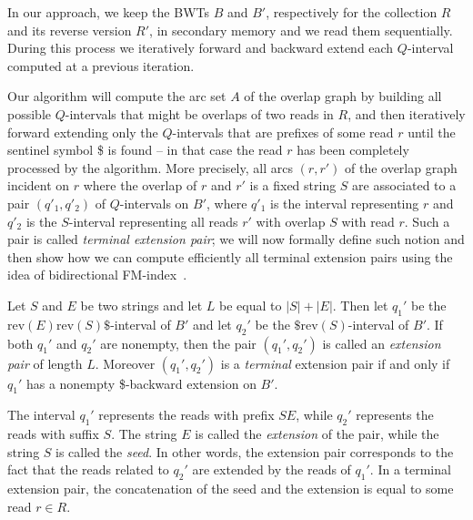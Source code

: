 \documentclass[runningheads,envcountsame,a4paper]{llncs}
\newcommand{\rev}{\ensuremath{\mathrm{rev}}}
\begin{document}
In our approach, we keep the BWTs $B$  and  $B'$, respectively  for the collection $R$ and its
reverse version $R'$,  in secondary memory and we read them sequentially.
During this process we iteratively forward and backward extend each
$Q$-interval computed at a previous iteration.

Our algorithm  will compute the arc set $A$  of the overlap graph
by building all possible $Q$-intervals that might be overlaps of two
reads in $R$, and then iteratively forward extending only the $Q$-intervals that
are prefixes of some read $r$ until the sentinel symbol \$ is
found -- in that case the read $r$ has been completely processed by the algorithm.
More precisely,    all arcs    $(r,r')$ of the overlap graph incident on $r$ where the overlap of $r$ and $r'$ is a fixed string $S$ are  associated to a pair  $(q'_1, q'_2)$ of $Q$-intervals on $B'$,
where $q'_1$ is the interval  representing   $r$ and $q'_2$ is the  $S$-interval representing all reads
 $r'$ with overlap $S$ with read $r$. Such a pair is called {\em terminal
extension pair}; we will now  formally define such notion and then show how we
can compute efficiently all terminal extension pairs
using the idea of bidirectional FM-index~\cite{Lam2009}.

\begin{definition}\label{def:extension-pair}
Let $S$ and $E$ be two strings and let $L$ be equal to $|S|+|E|$.
Then let $q_{1}'$ be the $\rev(E)\rev(S)\$$-interval of $B'$ and let  $q_{2}'$ be the $\$\rev(S)$-interval of $B'$.
If both $q_{1}'$ and  $q_{2}'$ are nonempty, then the pair  $(q_{1}', q_{2}')$ is called
an \emph{extension pair} of length $L$.
Moreover $(q_{1}', q_{2}')$ is a \emph{terminal} extension pair
if and only if $q_{1}'$ has a nonempty \$-backward extension on $B'$.
\end{definition}

The interval $q_{1}'$ represents   the reads with prefix $SE$, while $q_{2}'$
represents the reads with suffix $S$.
The  string $E$ is called the \emph{extension} of the
pair, while the string $S$ is called the \emph{seed}.
In other words, the extension pair corresponds to the fact that the reads related to $q_{2}'$ are extended by the reads
of $q_{1}'$.
In a terminal extension pair, the concatenation of the seed and the extension is
equal to some read $r \in R$.
\end{document}
